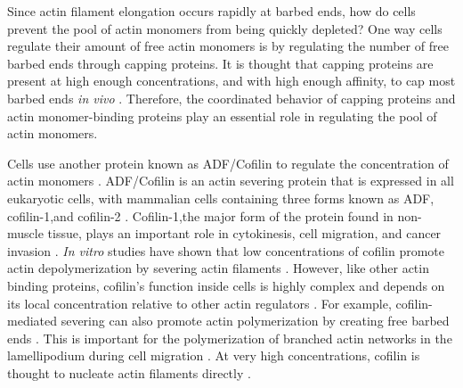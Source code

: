 \documentclass{ucetd}
\begin{document}
Since actin filament elongation occurs rapidly at barbed ends, how do cells prevent the pool of actin monomers from being quickly depleted?  One way cells regulate their amount of free actin monomers is by regulating the number of free barbed ends through capping proteins.  It is thought that capping proteins are present at high enough concentrations, and with high enough affinity, to cap most barbed ends \textit{in vivo} \cite{Schafer:1996vi}.  Therefore, the coordinated behavior of capping proteins and actin monomer-binding proteins play an essential role in regulating the pool of actin monomers.


Cells use another protein known as ADF/Cofilin to regulate the concentration of actin monomers \cite{Hotulainen:2005im}.  ADF/Cofilin is an actin severing protein that is expressed in all eukaryotic cells, with mammalian cells containing three forms known as ADF, cofilin-1,and cofilin-2 \cite{Bernstein:2010cn}.  Cofilin-1,the major form of the protein found in non-muscle tissue, plays an important role in cytokinesis, cell migration, and cancer invasion \cite{Chen:2011jh, Roussos:2011kx}.  \textit{In vitro} studies have shown that low concentrations of cofilin promote actin depolymerization by severing actin filaments \cite{Andrianantoandro:2006hk}.  However, like other actin binding proteins, cofilin's function inside cells is highly complex and depends on its local concentration relative to other actin regulators \cite{Bernstein:2010cn}.  For example, cofilin-mediated severing can also promote actin polymerization by creating free barbed ends \cite{Ichetovkin:2002ur}.  This is important for the polymerization of branched actin networks in the lamellipodium during cell migration \cite{BravoCordero:2013ef}.  At very high concentrations, cofilin is thought to nucleate actin filaments directly \cite{Andrianantoandro:2006hk}.
\end{document}
